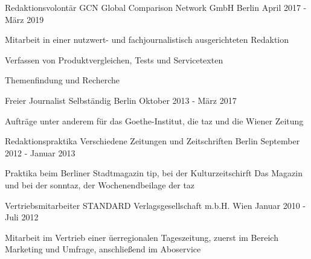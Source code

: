 \begin{cventries}
  \cventry
    {Redaktionsvolontär} %
    {GCN Global Comparison Network GmbH} %
    {Berlin} %
    {April 2017 - März 2019} %
    {
      \begin{cvitems} %
        \item {Mitarbeit in einer nutzwert- und fachjournalistisch ausgerichteten Redaktion}
        \item {Verfassen von Produktvergleichen, Tests und Servicetexten}
        \item {Themenfindung und Recherche}
       \end{cvitems}
    }

  \cventry
    {Freier Journalist} %
    {Selbständig} %
    {Berlin} %
    {Oktober 2013 - März 2017} %
    {
      \begin{cvitems} %
        \item {Aufträge unter anderem für das Goethe-Institut, die taz und die Wiener Zeitung}
       \end{cvitems}
    }

 \cventry
    {Redaktionspraktika} %
    {Verschiedene Zeitungen und Zeitschriften} %
    {Berlin} %
    {September 2012 - Januar 2013} %
    { 
      \begin{cvitems} %
        \item {Praktika beim Berliner Stadtmagazin tip, bei der Kulturzeitschirft Das Magazin und bei der sonntaz, der Wochenendbeilage der taz}
      \end{cvitems}
    }

  \cventry
    {Vertriebsmitarbeiter} %
    {STANDARD Verlagsgesellschaft m.b.H.} %
    {Wien} %
    {Januar 2010 - Juli 2012} %
    {
      \begin{cvitems} %
        \item {Mitarbeit im Vertrieb einer üerregionalen Tageszeitung, zuerst im Bereich Marketing und Umfrage, anschließend im Aboservice}
      \end{cvitems}
    }

\end{cventries}
